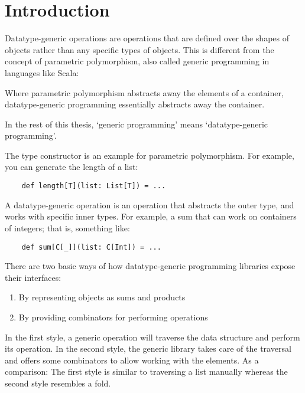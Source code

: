\chapter{Introduction}
Datatype-generic operations are operations that are defined over the shapes
of objects rather than any specific types of objects. This is different from
the concept of parametric polymorphism, also called generic programming in
languages like Scala:

Where parametric polymorphism abstracts away the elements of a container,
datatype-generic programming essentially abstracts away the container.

In the rest of this thesis, `generic programming' means `datatype-generic
programming'.


\begin{example}
The type constructor  is an example for parametric polymorphism. For
example, you can generate the length of a list:

\begin{lstlisting}
    def length[T](list: List[T]) = ...
\end{lstlisting}
\end{example}

\begin{example}
A datatype-generic operation is an operation that abstracts the outer type, and
works with specific inner types. For example, a sum that can work on containers
of integers; that is, something like:
\begin{lstlisting}
    def sum[C[_]](list: C[Int]) = ...
\end{lstlisting}
\end{example}

There are two basic ways of how datatype-generic programming libraries expose
their interfaces:

\begin{enumerate}
    \item By representing objects as sums and products
    \item By providing combinators for performing operations
\end{enumerate}

In the first style, a generic operation will traverse the data structure and
perform its operation. In the second style, the generic library takes care of
the traversal and offers some combinators to allow working with the elements.
As a comparison: The first style is similar to traversing a list manually whereas
the second style resembles a fold.
